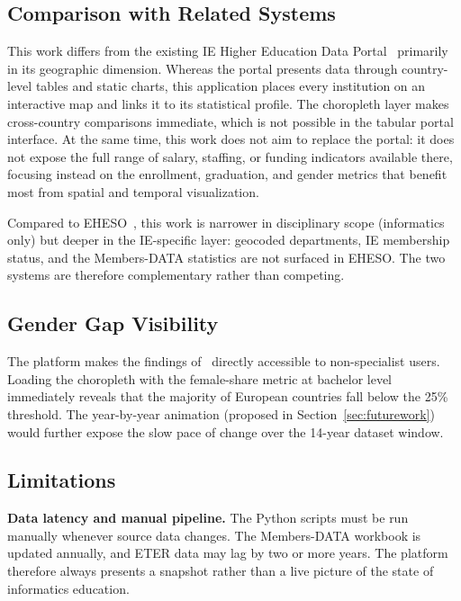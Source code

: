 \documentclass[final,3p,times,twocolumn]{elsarticle}
\begin{document}
\subsection{Comparison with Related Systems}

This work differs from the existing IE Higher Education Data Portal~\cite{IEPortal2023} primarily in its geographic dimension. Whereas the portal presents data through country-level tables and static charts, this application places every institution on an interactive map and links it to its statistical profile. The choropleth layer makes cross-country comparisons immediate, which is not possible in the tabular portal interface. At the same time, this work does not aim to replace the portal: it does not expose the full range of salary, staffing, or funding indicators available there, focusing instead on the enrollment, graduation, and gender metrics that benefit most from spatial and temporal visualization.

Compared to EHESO~\cite{Lepori2023}, this work is narrower in disciplinary scope (informatics only) but deeper in the IE-specific layer: geocoded departments, IE membership status, and the Members-DATA statistics are not surfaced in EHESO. The two systems are therefore complementary rather than competing.

\subsection{Gender Gap Visibility}

The platform makes the findings of~\cite{DAngelo2024} directly accessible to non-specialist users. Loading the choropleth with the female-share metric at bachelor level immediately reveals that the majority of European countries fall below the 25\% threshold. The year-by-year animation (proposed in Section~\ref{sec:futurework}) would further expose the slow pace of change over the 14-year dataset window.

\subsection{Limitations}

\textbf{Data latency and manual pipeline.} The Python scripts must be run manually whenever source data changes. The Members-DATA workbook is updated annually, and ETER data may lag by two or more years. The platform therefore always presents a snapshot rather than a live picture of the state of informatics education.
\end{document}
